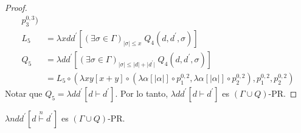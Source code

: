 \begin{proof}
\begin{align*}
             p_{3}^{0,3}) \\[10pt]
      L_5 &= \lambda xdd^{\prime} \left[(\exists \sigma \in \Gamma)_{\lvert\sigma\rvert \leq x} \; Q_{4}(d,d^{\prime},
             \sigma)\right] \\
      Q_5 &= \lambda dd^{\prime} \left[(\exists \sigma \in \Gamma)_{\lvert\sigma\rvert \leq \lvert d \rvert + \lvert
             d^{\prime} \rvert} \; Q_{4}(d,d^{\prime},\sigma)\right] \\
          &= L_5 \circ (\lambda xy \left[x + y\right] \circ(\lambda \alpha \left[\lvert\alpha\rvert\right] \circ
             p_{1}^{0,2}, \lambda \alpha \left[\lvert\alpha\rvert\right] \circ p_{2}^{0,2}), p_{1}^{0,2}, p_{2}^{0,2})
    \end{align*}
    Notar que $Q_5 = \lambda dd^{\prime } \left[ d\vdash d^{\prime }\right]$. Por lo tanto,
    $\lambda dd^{\prime } \left[ d\vdash d^{\prime }\right]$ es $(\Gamma \cup Q)$-PR.
  \end{proof}

	\begin{proposition}
		\PN $\lambda ndd^{\prime} \left[d \overset{n}{\vdash} d^{\prime}\right]$ es $(\Gamma \cup Q)$-PR.
	\end{proposition}

